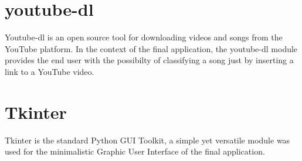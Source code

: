 \section{youtube-dl}
Youtube-dl is an open source tool for downloading videos and songs from the YouTube platform. In the
context of the final application, the youtube-dl module provides the end user with the possibilty of classifying
a song just by inserting a link to a YouTube video.

\section{Tkinter}
Tkinter is the standard Python GUI Toolkit, a simple yet versatile module was used for the minimalistic Graphic
User Interface of the final application.
